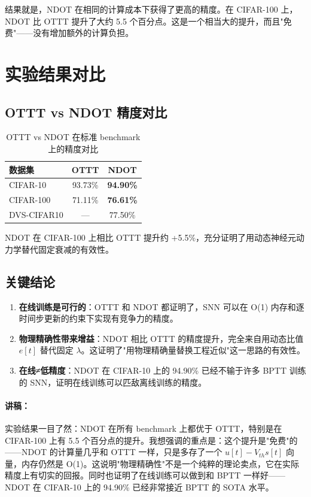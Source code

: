 \documentclass[journal,12pt,onecolumn]{IEEEtran}
\begin{document}
结果就是，NDOT 在相同的计算成本下获得了更高的精度。在 CIFAR-100 上，NDOT 比 OTTT 提升了大约 5.5 个百分点。这是一个相当大的提升，而且"免费"——没有增加额外的计算负担。

\section{实验结果对比}

\subsection*{OTTT vs NDOT 精度对比}

\begin{table}[h]
\centering
\caption{OTTT vs NDOT 在标准 benchmark 上的精度对比}
\begin{tabular}{lcc}
\toprule
\textbf{数据集} & \textbf{OTTT} & \textbf{NDOT} \\
\midrule
CIFAR-10   & 93.73\% & \textbf{94.90\%} \\
CIFAR-100  & 71.11\% & \textbf{76.61\%} \\
DVS-CIFAR10& —       & 77.50\% \\
\bottomrule
\end{tabular}
\label{tab.results}
\end{table}

NDOT 在 CIFAR-100 上相比 OTTT 提升约 +5.5\%，充分证明了用动态神经元动力学替代固定衰减的有效性。

\subsection*{关键结论}

\begin{enumerate}
    \item \textbf{在线训练是可行的}：OTTT 和 NDOT 都证明了，SNN 可以在 O(1) 内存和逐时间步更新的约束下实现有竞争力的精度。
    \item \textbf{物理精确性带来增益}：NDOT 相比 OTTT 的精度提升，完全来自用动态比值 $e[t]$ 替代固定 $\lambda$。这证明了"用物理精确量替换工程近似"这一思路的有效性。
    \item \textbf{在线≠低精度}：NDOT 在 CIFAR-10 上的 94.90\% 已经不输于许多 BPTT 训练的 SNN，证明在线训练可以匹敌离线训练的精度。
\end{enumerate}

\paragraph{讲稿：}
实验结果一目了然：NDOT 在所有 benchmark 上都优于 OTTT，特别是在 CIFAR-100 上有 5.5 个百分点的提升。我想强调的重点是：这个提升是"免费"的——NDOT 的计算量几乎和 OTTT 一样，只是多存了一个 $u[t] - V_{th}s[t]$ 向量，内存仍然是 O(1)。这说明"物理精确性"不是一个纯粹的理论卖点，它在实际精度上有切实的回报。同时也证明了在线训练可以做到和 BPTT 一样好——NDOT 在 CIFAR-10 上的 94.90\% 已经非常接近 BPTT 的 SOTA 水平。
\end{document}
